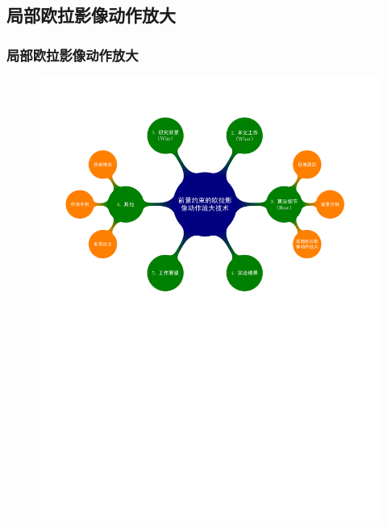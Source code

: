 \documentclass[xcolor=svgnames,serif,table,10pt]{beamer}
\begin{document}
\subsection{局部欧拉影像动作放大}

\begin{frame}
  \frametitle{局部欧拉影像动作放大}
  \vspace{-2.5em}
  \begin{figure}
    \centering
    \includegraphics[width=\textwidth, page=7]{mindmap.pdf}
  \end{figure}
\end{frame}
\end{document}
